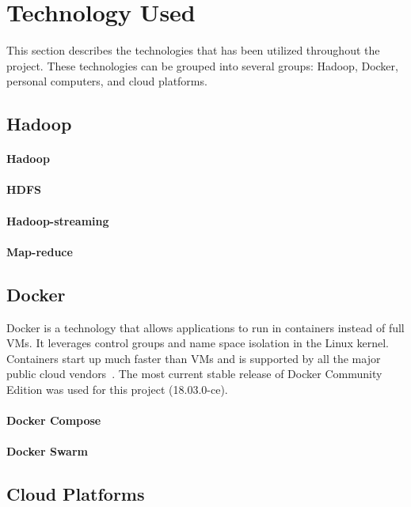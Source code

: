 \section{Technology Used}

This section describes the technologies that has been utilized
throughout the project. These technologies can be grouped into several
groups: Hadoop, Docker, personal computers, and cloud platforms.

\subsection{Hadoop}

\paragraph{Hadoop}
\paragraph{HDFS}
\paragraph{Hadoop-streaming}
\paragraph{Map-reduce}


\subsection{Docker}
Docker is a technology that allows applications to run in containers
instead of full VMs. It leverages control groups and name space
isolation in the Linux kernel. Containers start up much faster than
VMs and is supported by all the major public cloud
vendors~\cite{Foster:2017:CCS:3158276}. The most current stable
release of Docker Community Edition was used for this project
(18.03.0-ce).
\paragraph{Docker Compose}
\paragraph{Docker Swarm}


\subsection{Cloud Platforms}
